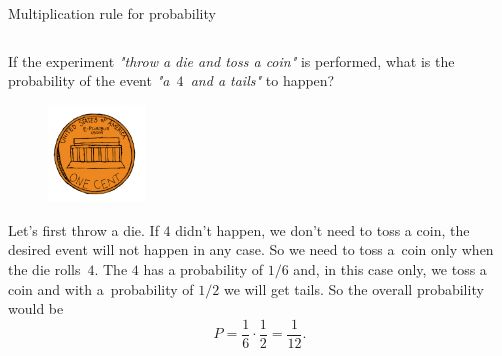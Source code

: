 \documentclass[9pt,aspectratio=169]{beamer}
\begin{document}
\begin{frame}{Multiplication rule for probability}
  \begin{columns}[T]
    \begin{column}{0.5\textwidth}
      \begin{problem}
        If the experiment \emph{"throw a die and toss a coin"} is performed, what is the probability of the event \emph{"a~$4$~and a tails"} to happen?
      \end{problem}
      \begin{figure}%
        \vspace{-1.6em}
        \includegraphics[width=0.23\textwidth]{03 - Probability/tail.png}
      \end{figure}
      Let's first throw a die. If $4$ didn’t happen, we don’t need to toss a coin, the desired event will not happen in any case. So we need to toss a~coin only when the die rolls~$4$. The $4$ has a probability of $1/6$ and, in this case only, we toss a coin and with a~probability of $1/2$ we will get tails. So the overall probability would be
      \[ P = \frac{1}{6} \cdot \frac{1}{2} = \frac{1}{12}. \] 


\end{column}
\end{columns}
\end{frame}
\end{document}
